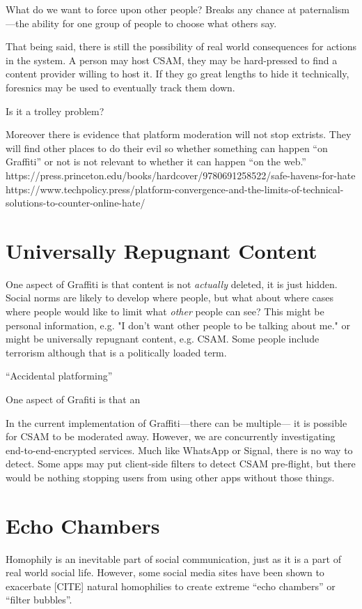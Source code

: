 What do we want to force upon other people?
Breaks any chance at paternalism---the ability for one group of people to choose what others say.

That being said, there is still the possibility of real world consequences for actions in the system.
A person may host CSAM, they may be hard-pressed to find a content provider willing to host it.
If they go great lengths to hide it technically, foresnics may be used to eventually track them down.

Is it a trolley problem?

Moreover there is evidence that platform moderation will not stop extrists.
They will find other places to do their evil so whether something can happen ``on Graffiti''
or not is not relevant to whether it can happen ``on the web.''
https://press.princeton.edu/books/hardcover/9780691258522/safe-havens-for-hate
https://www.techpolicy.press/platform-convergence-and-the-limits-of-technical-solutions-to-counter-online-hate/

\section{Universally Repugnant Content}

One aspect of Graffiti is that content is not \emph{actually} deleted,
it is just hidden.
Social norms are likely to develop where people,
but what about where cases where people would like to limit what
\emph{other} people can see?
This might be personal information, e.g. "I don't want other people to be talking about me."
or might be universally repugnant content, e.g. CSAM. Some people include terrorism although
that is a politically loaded term.

``Accidental platforming''

One aspect of Grafiti is that an

In the current implementation of Graffiti---there can be multiple---
it is possible for CSAM to be moderated away. However, we are concurrently
investigating end-to-end-encrypted services.
Much like WhatsApp or Signal, there is no way to detect.
Some apps may put client-side filters to detect CSAM pre-flight,
but there would be nothing stopping users from using other apps without those things.

\section{Echo Chambers}

Homophily is an inevitable part of social communication,
just as it is a part of real world social life.
However, some social media sites have been shown to exacerbate [CITE]
natural homophilies to create extreme ``echo chambers'' or ``filter bubbles''.

